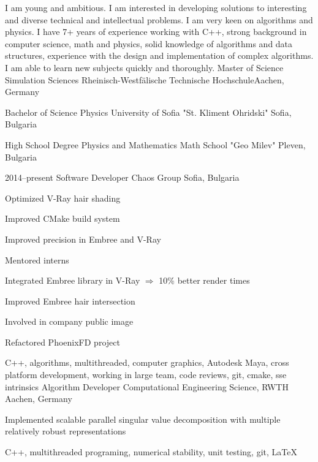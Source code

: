 I am young and ambitious. I am interested in developing solutions to
interesting and diverse technical and intellectual problems. I am very
keen on algorithms and physics. I have 7+ years of experience working
with C++, strong background in computer science, math and physics,
solid knowledge of algorithms and data structures, experience with the
design and implementation of complex algorithms. I am able to learn
new subjects quickly and thoroughly.
{Master of Science}
{Simulation Sciences}
{Rheinisch-Westfälische Technische Hochschule}{Aachen, Germany}

{Bachelor of Science}
{Physics}
{University of Sofia "St. Kliment Ohridski"}
{Sofia, Bulgaria}

{High School Degree}
{Physics and Mathematics}
{Math School "Geo Milev"}
{Pleven, Bulgaria}

\myjobb
{2014--present}
{Software Developer}
{Chaos Group}
{Sofia, Bulgaria}
{
\item Optimized V-Ray hair shading
\item Improved CMake build system 
\item Improved precision in Embree and V-Ray
\item Mentored interns
}
{
\item Integrated Embree library in V-Ray $\Rightarrow$ 10\% better render times 
\item Improved Embree hair intersection 
\item Involved in company public image
\item Refactored PhoenixFD project
}
{C++, algorithms, multithreaded, computer graphics, Autodesk Maya, cross platform development, working in large team, code reviews, git, cmake, sse intrinsics}
{Algorithm Developer}
{Computational Engineering Science, RWTH}
{Aachen, Germany}
{ \item Implemented scalable parallel singular value decomposition with multiple relatively robust representations}
{C++, multithreaded programing, numerical stability, unit testing, git, \LaTeX}

